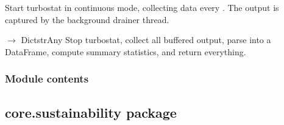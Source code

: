 \documentclass[letterpaper,10pt,english]{sphinxmanual}
\begin{document}
\begin{fulllineitems}
\begin{fulllineitems}
\label{\detokenize{core.readers.turbostat_reader:core.readers.turbostat_reader.TurbostatReader.start_monitoring}}
\pysigstartsignatures
\pysiglinewithargsret
{}
{}
{}
\pysigstopsignatures
\sphinxAtStartPar
Start turbostat in continuous mode, collecting data every .
The output is captured by the background drainer thread.

\end{fulllineitems}


\begin{fulllineitems}
\label{\detokenize{core.readers.turbostat_reader:core.readers.turbostat_reader.TurbostatReader.stop_monitoring}}
\pysigstartsignatures
\pysiglinewithargsret
{}
{}
{{ $\rightarrow$ Dict\DUrole{p}{{[}}strAny\DUrole{p}{{]}}}}
\pysigstopsignatures
\sphinxAtStartPar
Stop turbostat, collect all buffered output, parse into a DataFrame,
compute summary statistics, and return everything.

\end{fulllineitems}


\end{fulllineitems}



\subsubsection{Module contents}
\label{\detokenize{core.readers:module-core.readers}}\label{\detokenize{core.readers:module-contents}}
\sphinxstepscope


\subsection{core.sustainability package}
\label{\detokenize{core.sustainability:core-sustainability-package}}\label{\detokenize{core.sustainability::doc}}
\end{document}
